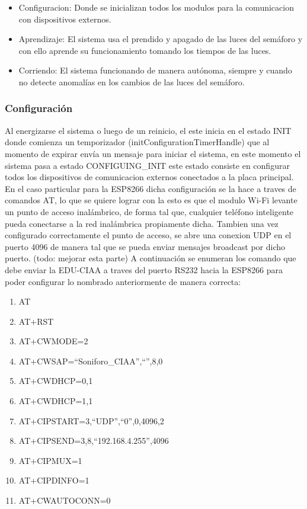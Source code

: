 \begin{itemize}
\item Configuracion: Donde se inicializan todos los modulos para la comunicacion con dispositivos externos. 
\item Aprendizaje: El sistema usa el prendido y apagado de las luces del semáforo y con ello aprende su funcionamiento tomando los tiempos de las luces.
\item Corriendo: El sistema funcionando de manera autónoma, siempre y cuando no detecte anomalías en los cambios de las luces del semáforo.
\end{itemize}

\subsubsection{Configuración}
Al energizarse el sistema o luego de un reinicio, el este inicia en el estado INIT donde comienza un temporizador (initConfigurationTimerHandle) que al momento de expirar envía un mensaje para iniciar el sistema, en este momento el sistema pasa a estado CONFIGUING\_INIT este estado consiste en configurar todos los dispositivos de comunicacion externos conectados a la placa principal. 
En el caso particular para la ESP8266 dicha configuración se la hace a traves de comandos AT, lo que se quiere lograr con la esto es que el modulo Wi-Fi levante un punto de acceso inalámbrico, de forma tal que, cualquier teléfono inteligente pueda conectarse a la red inalámbrica propiamente dicha. Tambien una vez configurado correctamente el punto de acceso, se abre una conexion UDP en el puerto 4096 de manera tal que se pueda enviar mensajes broadcast por dicho puerto. (todo: mejorar esta parte)
A continuación se enumeran los comando que debe enviar la EDU-CIAA a traves del puerto RS232 hacia la ESP8266 para poder configurar lo nombrado anteriormente de manera correcta:

\begin{enumerate}
\item{AT}
\item{AT+RST}
\item{AT+CWMODE=2}
\item{AT+CWSAP=``Soniforo\_CIAA'',``'',8,0}
\item{AT+CWDHCP=0,1}
\item{AT+CWDHCP=1,1}
\item{AT+CIPSTART=3,``UDP'',``0'',0,4096,2}
\item{AT+CIPSEND=3,8,``192.168.4.255'',4096}
\item{AT+CIPMUX=1}
\item{AT+CIPDINFO=1}
\item{AT+CWAUTOCONN=0}
\end{enumerate}

